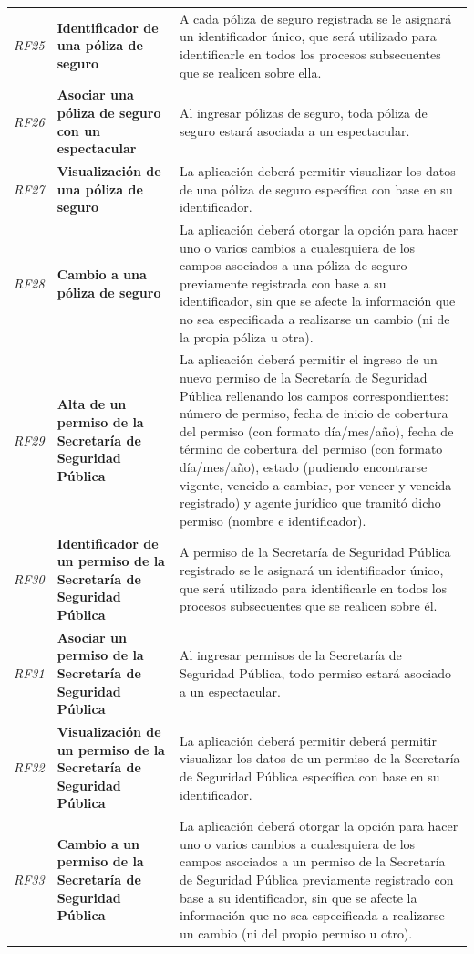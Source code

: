 \documentclass[12pt]{article}
\begin{document}
{\begin{longtable}[H]{m{2cm}m{4cm}m{6cm}}
     \textit{RF25} & \textbf{Identificador de una póliza de seguro} & A cada póliza de seguro registrada se le asignará un identificador único, que será utilizado para identificarle en todos los procesos subsecuentes que se realicen sobre ella.& \tabularnewline
     \textit{RF26} & \textbf{Asociar una póliza de seguro con un espectacular} & Al ingresar pólizas de seguro, toda póliza de seguro estará asociada a un espectacular. \tabularnewline
     \textit{RF27} & \textbf{Visualización de una póliza de seguro} & La aplicación deberá permitir visualizar los datos de una póliza de seguro específica con base en su identificador.\tabularnewline
     \textit{RF28} & \textbf{Cambio a una póliza de seguro} & La aplicación deberá otorgar la opción para hacer uno o varios cambios a cualesquiera de los campos asociados a una póliza de seguro previamente registrada con base a su identificador, sin que se afecte la información que no sea especificada a realizarse un cambio (ni de la propia póliza u otra).\tabularnewline
     \textit{RF29} & \textbf{Alta de un permiso de la Secretaría de Seguridad Pública} & La aplicación deberá permitir el ingreso de un nuevo permiso de la Secretaría de Seguridad Pública rellenando los campos correspondientes: número de permiso, fecha de inicio de cobertura del permiso (con formato día/mes/año), fecha de término de cobertura del permiso (con formato día/mes/año), estado (pudiendo encontrarse vigente, vencido a cambiar, por vencer y vencida registrado) y agente jurídico que tramitó dicho permiso (nombre e identificador).\tabularnewline
     \textit{RF30} & \textbf{Identificador de un permiso de la Secretaría de Seguridad Pública} & A permiso de la Secretaría de Seguridad Pública registrado se le asignará un identificador único, que será utilizado para identificarle en todos los procesos subsecuentes que se realicen sobre él. \tabularnewline
     \textit{RF31} & \textbf{Asociar un permiso de la Secretaría de Seguridad Pública} & Al ingresar permisos de la Secretaría de Seguridad Pública, todo permiso estará asociado a un espectacular. \tabularnewline
     \textit{RF32} & \textbf{Visualización de un permiso de la Secretaría de Seguridad Pública} & La aplicación deberá permitir deberá permitir visualizar los datos de un permiso de la Secretaría de Seguridad Pública específica con base en su identificador.\tabularnewline
     \textit{RF33} & \textbf{Cambio a un permiso de la Secretaría de Seguridad Pública} & La aplicación deberá otorgar la opción para hacer uno o varios cambios a cualesquiera de los campos asociados a un permiso de la Secretaría de Seguridad Pública previamente registrado con base a su identificador, sin que se afecte la información que no sea especificada a realizarse un cambio (ni del propio permiso u otro).\tabularnewline

\end{longtable}}
\end{document}
